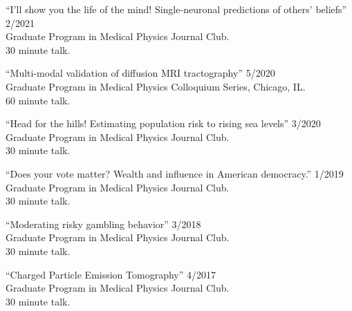 \documentclass[10pt,letterpaper]{article}
\begin{document}
\begin{benumerate}{6}

\item {``I'll show you the life of the mind! Single-neuronal predictions of
    others' beliefs'' \hfill 2/2021\\
    Graduate Program in Medical Physics Journal Club. \\
    30 minute talk.
  }
\item{``Multi-modal validation of diffusion MRI tractography'' \hfill 5/2020\\
    Graduate Program in Medical Physics Colloquium Series, Chicago, IL.\\
    60 minute talk.}

\item{``Head for the hills! Estimating population risk to rising sea levels'' \hfill 3/2020\\
    Graduate Program in Medical Physics Journal Club. \\
    30 minute talk.}

\item{``Does your vote matter? Wealth and influence in American democracy.'' \hfill 1/2019\\
    Graduate Program in Medical Physics Journal Club. \\
    30 minute talk.}

\item{``Moderating risky gambling behavior'' \hfill 3/2018\\
    Graduate Program in Medical Physics Journal Club. \\
    30 minute talk.}
  
\item{``Charged Particle Emission Tomography'' \hfill 4/2017\\
    Graduate Program in Medical Physics Journal Club. \\
    30 minute talk.}

\end{benumerate}
\end{document}
